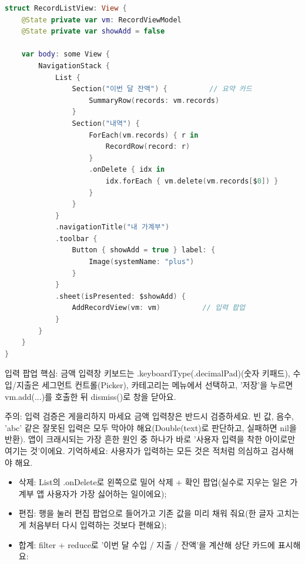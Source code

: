 
\begin{lstlisting}[language=Swift]
struct RecordListView: View {
    @State private var vm: RecordViewModel
    @State private var showAdd = false

    var body: some View {
        NavigationStack {
            List {
                Section("이번 달 잔액") {          // 요약 카드
                    SummaryRow(records: vm.records)
                }
                Section("내역") {
                    ForEach(vm.records) { r in
                        RecordRow(record: r)
                    }
                    .onDelete { idx in
                        idx.forEach { vm.delete(vm.records[$0]) }
                    }
                }
            }
            .navigationTitle("내 가계부")
            .toolbar {
                Button { showAdd = true } label: {
                    Image(systemName: "plus")
                }
            }
            .sheet(isPresented: $showAdd) {
                AddRecordView(vm: vm)          // 입력 팝업
            }
        }
    }
}
\end{lstlisting}

입력 팝업 핵심: 금액 입력창 키보드는 .keyboardType(.decimalPad)(숫자 키패드), 수입/지출은 세그먼트 컨트롤(Picker), 카테고리는 메뉴에서 선택하고, '저장'을 누르면 vm.add(...)를 호출한 뒤 dismiss()로 창을 닫아요.

\begin{tcbwarn}{주의: 입력 검증은 게을리하지 마세요}
금액 입력창은 반드시 검증하세요. 빈 값, 음수, 'abc' 같은 잘못된 입력은 모두 막아야 해요(Double(text)로 판단하고, 실패하면 nil을 반환). 앱이 크래시되는 가장 흔한 원인 중 하나가 바로 '사용자 입력을 착한 아이로만 여기는 것'이에요. 기억하세요: 사용자가 입력하는 모든 것은 적처럼 의심하고 검사해야 해요.

\end{tcbwarn}


\begin{itemize}
  \item 삭제: List의 .onDelete로 왼쪽으로 밀어 삭제 + 확인 팝업(실수로 지우는 일은 가계부 앱 사용자가 가장 싫어하는 일이에요);
  \item 편집: 행을 눌러 편집 팝업으로 들어가고 기존 값을 미리 채워 줘요(한 글자 고치는 게 처음부터 다시 입력하는 것보다 편해요);
  \item 합계: filter + reduce로 '이번 달 수입 / 지출 / 잔액'을 계산해 상단 카드에 표시해요:
\end{itemize}

